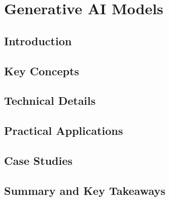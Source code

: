 ﻿%

\chapter{Generative AI Models}
\label{ch:chapter-07}

\section{Introduction}


\section{Key Concepts}


\section{Technical Details}


\section{Practical Applications}


\section{Case Studies}


\section{Summary and Key Takeaways}


